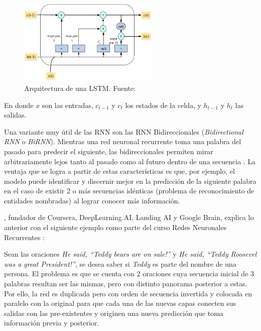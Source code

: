 \begin{itemize}
\begin{itemize}
		\begin{figure}[!ht]
			\begin{center}
				\includegraphics[width=0.6\textwidth]{2/figures/lstm.png}
				\caption[Arquitectura de una LSTM]{Arquitectura de una LSTM. Fuente: \cite{tec_yuan2019lstm}}
				\label{2:fig42}
			\end{center}
		\end{figure}
	
		En donde $x$ son las entradas, $c_{t-1}$ y $c_{t}$ los estados de la celda, y $h_{t-1}$ y $h_{t}$  las salidas.
		
		Una variante muy útil de las RNN son las RNN Bidireccionales (\textit{Bidirectional RNN} o \textit{BiRNN}). Mientras una red neuronal recurrente toma una palabra del pasado para predecir el siguiente, las bidireccionales permiten mirar arbitrariamente lejos tanto al pasado como al futuro dentro de una secuencia \parencite{bk_goldberg2017nn_nlp}.
		La ventaja que se logra a partir de estas características es que, por ejemplo, el modelo puede identificar y discernir mejor en la predicción de la siguiente palabra en el caso de existir 2 o más secuencias idénticas (problema de reconocimiento de entidades nombradas) al lograr conocer más información.
		
		\citeauthor{tec_ng2018bidirectionalRNN}, fundador de Coursera, DeepLearning.AI, Landing AI y Google Brain, explica lo anterior con el siguiente ejemplo como parte del curso Redes Neuronales Recurrentes \parencite{tec_ng2018bidirectionalRNN}:
		
		Sean las oraciones \textit{He said, “Teddy bears are on sale!”} y \textit{He said, “Teddy Roosevel was a great President!”}, se desea saber si \textit{Teddy} es parte del nombre de una persona. El problema es que se cuenta con 2 oraciones cuya secuencia inicial de 3 palabras resultan ser las mismas, pero con distinto panorama posterior a estas. Por ello, la red es duplicada pero con orden de secuencia invertida y colocada en paralelo con la original para que cada una de las nuevas capas conecten sus salidas con las pre-existentes y originen una nueva predicción que toma información previa y posterior.
		

\end{itemize}
\end{itemize}

